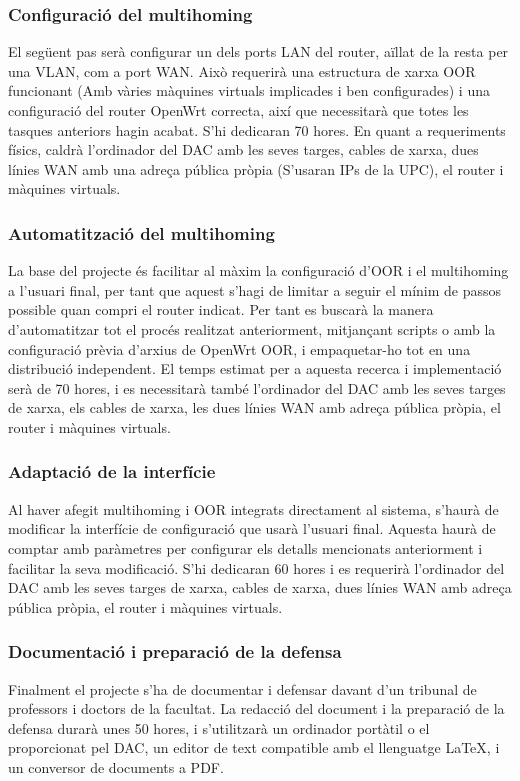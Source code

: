 \documentclass[11pt]{article}
\begin{document}
\subsubsection{Configuració del multihoming}
El següent pas serà configurar un dels ports LAN del router, aïllat de la resta per una VLAN, com a port WAN. Això requerirà una estructura de xarxa OOR funcionant (Amb vàries màquines virtuals implicades i ben configurades) i una configuració del router OpenWrt  correcta, així que necessitarà que totes les tasques anteriors hagin acabat. S’hi dedicaran 70 hores. En quant a requeriments físics, caldrà l’ordinador del DAC amb les seves targes, cables de xarxa, dues línies WAN amb una adreça pública pròpia (S’usaran IPs de la UPC), el router i màquines virtuals.
\subsubsection{Automatització del multihoming}
La base del projecte és facilitar al màxim la configuració d’OOR i el multihoming a l’usuari final, per tant que aquest s’hagi de limitar a seguir el mínim de passos possible quan compri el router indicat. Per tant es buscarà la manera d’automatitzar tot el procés realitzat anteriorment, mitjançant scripts o amb la configuració prèvia d’arxius de OpenWrt OOR, i empaquetar-ho tot en una distribució independent. El temps estimat per a aquesta recerca i implementació serà de 70 hores, i es necessitarà també l’ordinador del DAC amb les seves targes de xarxa, els cables de xarxa, les dues línies WAN amb adreça pública pròpia, el router i màquines virtuals.
\subsubsection{Adaptació de la interfície}
Al haver afegit multihoming i OOR integrats directament al sistema, s’haurà de modificar la interfície de configuració que usarà l’usuari final. Aquesta haurà de comptar amb paràmetres per configurar els detalls mencionats anteriorment i facilitar la seva modificació. S’hi dedicaran 60 hores i es requerirà l’ordinador del DAC amb les seves targes de xarxa, cables de xarxa, dues línies WAN amb adreça pública pròpia, el router i màquines virtuals.
\subsubsection{Documentació i preparació de la defensa}
Finalment el projecte s’ha de documentar i defensar davant d’un tribunal de professors i doctors de la facultat. La redacció del document i la preparació de la defensa durarà unes 50 hores, i s’utilitzarà un ordinador portàtil o el proporcionat pel DAC, un editor de text compatible amb el llenguatge LaTeX, i un conversor de documents a PDF.
\end{document}
